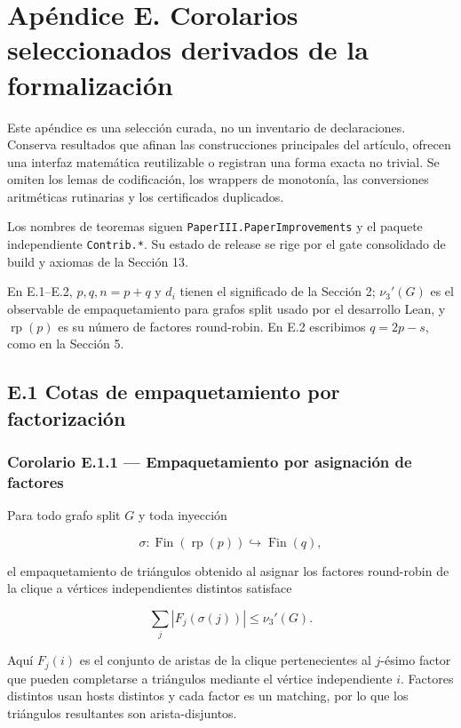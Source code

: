 \documentclass[
  spanish,
  11pt,
  a4paper,
]{article}
\begin{document}
\section{Apéndice E. Corolarios seleccionados derivados de la formalización}\label{apuxe9ndice-e.-corolarios-seleccionados-derivados-de-la-formalizaciuxf3n}

Este apéndice es una selección curada, no un inventario de declaraciones. Conserva resultados que afinan las construcciones principales del artículo, ofrecen una interfaz matemática reutilizable o registran una forma exacta no trivial. Se omiten los lemas de codificación, los wrappers de monotonía, las conversiones aritméticas rutinarias y los certificados duplicados.

Los nombres de teoremas siguen \texttt{PaperIII.PaperImprovements} y el paquete independiente \texttt{Contrib.*}. Su estado de release se rige por el gate consolidado de build y axiomas de la Sección 13.

En E.1--E.2, \(p,q,n=p+q\) y \(d_i\) tienen el significado de la Sección 2; \(\nu_3'(G)\) es el observable de empaquetamiento para grafos split usado por el desarrollo Lean, y \(\operatorname{rp}(p)\) es su número de factores round-robin. En E.2 escribimos \(q=2p-s\), como en la Sección 5.

\subsection{E.1 Cotas de empaquetamiento por factorización}\label{e.1-cotas-de-empaquetamiento-por-factorizaciuxf3n}

\subsubsection{Corolario E.1.1 --- Empaquetamiento por asignación de factores}\label{corolario-e.1.1-empaquetamiento-por-asignaciuxf3n-de-factores}

Para todo grafo split \(G\) y toda inyección

\[\sigma:\operatorname{Fin}(\operatorname{rp}(p))\hookrightarrow \operatorname{Fin}(q),\]

el empaquetamiento de triángulos obtenido al asignar los factores round-robin de la clique a vértices independientes distintos satisface

\[\sum_j |F_j(\sigma(j))|\le \nu_3'(G).\]

Aquí \(F_j(i)\) es el conjunto de aristas de la clique pertenecientes al \(j\)-ésimo factor que pueden completarse a triángulos mediante el vértice independiente \(i\). Factores distintos usan hosts distintos y cada factor es un matching, por lo que los triángulos resultantes son arista-disjuntos.
\end{document}
